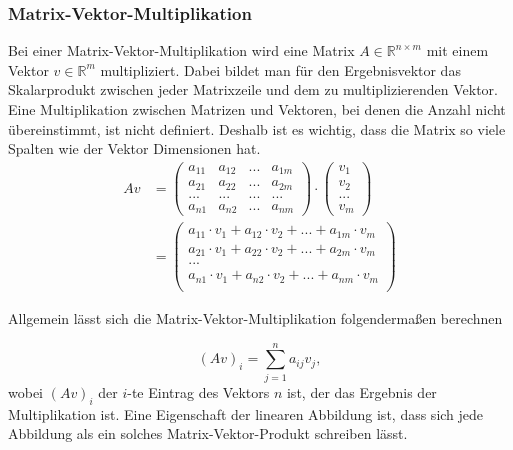 \subsubsection{Matrix-Vektor-Multiplikation}
Bei einer Matrix-Vektor-Multiplikation wird eine Matrix $A \in  \mathbb{R}^{n \times m}$ mit einem Vektor $v \in \mathbb{R}^m$ multipliziert. Dabei bildet man f\"ur den Ergebnisvektor das Skalarprodukt zwischen jeder Matrixzeile und dem zu multiplizierenden Vektor. Eine Multiplikation zwischen Matrizen und Vektoren, bei denen die Anzahl nicht übereinstimmt, ist nicht definiert. Deshalb ist es wichtig, dass die Matrix so viele Spalten wie der Vektor Dimensionen hat.
\begin{align*}
	Av &= 
	\left(
   \begin{array}{cccc}
	  a_{11} & a_{12} & ... & a_{1m}\\
		a_{21} & a_{22} & ... & a_{2m}\\
		...   & ...   & ... & ...  \\
		a_{n1} & a_{n2} & ... & a_{nm}
	 \end{array}
	\right) 
	\cdot 
	\left(
	 \begin{array}{c}
	  v_1\\
		v_2\\
		...\\
		v_m
	 \end{array}
	\right)\\
	&= \left(
	 \begin{array}{c}
	 a_{11} \cdot v_1 + a_{12} \cdot v_2 + ... + a_{1m} \cdot v_m\\
	 a_{21} \cdot v_1 + a_{22} \cdot v_2 + ... + a_{2m} \cdot v_m\\
		...\\
	 a_{n1} \cdot v_1 + a_{n2} \cdot v_2 + ... + a_{nm} \cdot v_m\\
	 \end{array}
	\right)
\end{align*}

Allgemein lässt sich die Matrix-Vektor-Multiplikation folgendermaßen berechnen

\begin{equation*}
(Av)_i = \sum_{j=1}^{n}a_{ij}v_j ,
\end{equation*}
wobei $(Av)_i$ der $i$-te Eintrag des Vektors $n$ ist, der das Ergebnis der Multiplikation ist. Eine Eigenschaft der linearen Abbildung ist, dass sich jede Abbildung als ein solches Matrix-Vektor-Produkt schreiben lässt. 

